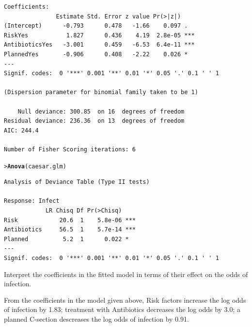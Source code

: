 \documentclass[10pt]{report}\usepackage[]{graphicx}\usepackage[]{color}
\makeatletter
\newcommand{\hlstd}[1]{\textcolor[rgb]{0.345,0.345,0.345}{#1}}%
\newcommand{\hlkwd}[1]{\textcolor[rgb]{0.737,0.353,0.396}{\textbf{#1}}}%
\newenvironment{kframe}{%
 \def\at@end@of@kframe{}%
 \ifinner\ifhmode%
  \def\at@end@of@kframe{\end{minipage}}%
  \begin{minipage}{\columnwidth}%
 \fi\fi%
 \def\FrameCommand##1{\hskip\@totalleftmargin \hskip-\fboxsep
 \colorbox{shadecolor}{##1}\hskip-\fboxsep
     \hskip-\linewidth \hskip-\@totalleftmargin \hskip\columnwidth}%
 \MakeFramed {\advance\hsize-\width
   \@totalleftmargin\z@ \linewidth\hsize
   \@setminipage}}%
 {\par\unskip\endMakeFramed%
 \at@end@of@kframe}
\newenvironment{knitrout}{}{} %
\renewenvironment{knitrout}{\small\renewcommand{\baselinestretch}{.85}}{} %
\makeatother
\begin{document}
\begin{Exercises}
\begin{enumerate*}
\begin{ans}
\begin{knitrout}
\begin{kframe}
\begin{verbatim}
Coefficients:
               Estimate Std. Error z value Pr(>|z|)    
(Intercept)      -0.793      0.478   -1.66    0.097 .  
RiskYes           1.827      0.436    4.19  2.8e-05 ***
AntibioticsYes   -3.001      0.459   -6.53  6.4e-11 ***
PlannedYes       -0.906      0.408   -2.22    0.026 *  
---
Signif. codes:  0 '***' 0.001 '**' 0.01 '*' 0.05 '.' 0.1 ' ' 1

(Dispersion parameter for binomial family taken to be 1)

    Null deviance: 300.85  on 16  degrees of freedom
Residual deviance: 236.36  on 13  degrees of freedom
AIC: 244.4

Number of Fisher Scoring iterations: 6
\end{verbatim}
\begin{alltt}
\hlstd{> }\hlkwd{Anova}\hlstd{(caesar.glm)}
\end{alltt}
\begin{verbatim}
Analysis of Deviance Table (Type II tests)

Response: Infect
            LR Chisq Df Pr(>Chisq)    
Risk            20.6  1    5.8e-06 ***
Antibiotics     56.5  1    5.7e-14 ***
Planned          5.2  1      0.022 *  
---
Signif. codes:  0 '***' 0.001 '**' 0.01 '*' 0.05 '.' 0.1 ' ' 1
\end{verbatim}
\end{kframe}
\end{knitrout}

    \end{ans}
    
    \item Interpret the coefficients in the fitted model in terms of their effect on the odds
    of infection. 
    \begin{ans}
    From the coefficients in the model given above, Risk factors increase the log odds of
    infection by 1.83; treatment with Antibiotics decreases the log odds by 3.0;
    a planned C-section descreases the log odds of infection by 0.91.
    

\end{ans}
\end{enumerate*}
\end{Exercises}
\end{document}
